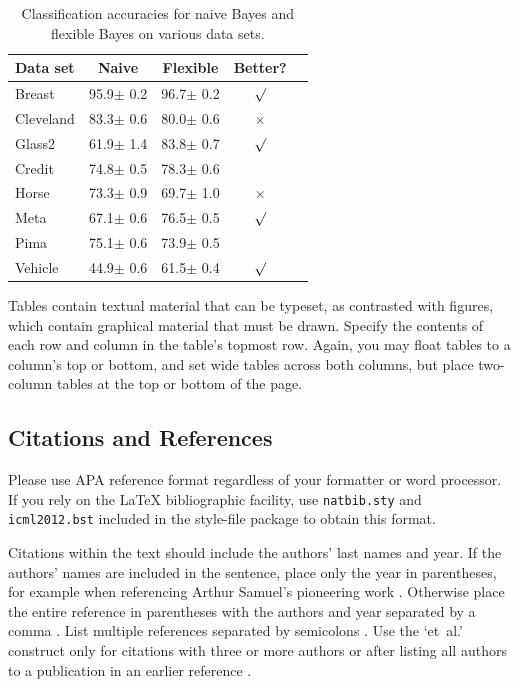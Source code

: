 \documentclass{article}
\begin{document}
\begin{table}[t]
\caption{Classification accuracies for naive Bayes and flexible
Bayes on various data sets.}
\label{sample-table}
\vskip 0.15in
\begin{center}
\begin{small}
\begin{sc}
\begin{tabular}{lcccr}
\hline
\abovespace\belowspace
Data set & Naive & Flexible & Better? \\
\hline
\abovespace
Breast    & 95.9$\pm$ 0.2& 96.7$\pm$ 0.2& $\surd$ \\
Cleveland & 83.3$\pm$ 0.6& 80.0$\pm$ 0.6& $\times$\\
Glass2    & 61.9$\pm$ 1.4& 83.8$\pm$ 0.7& $\surd$ \\
Credit    & 74.8$\pm$ 0.5& 78.3$\pm$ 0.6&         \\
Horse     & 73.3$\pm$ 0.9& 69.7$\pm$ 1.0& $\times$\\
Meta      & 67.1$\pm$ 0.6& 76.5$\pm$ 0.5& $\surd$ \\
Pima      & 75.1$\pm$ 0.6& 73.9$\pm$ 0.5&         \\
\belowspace
Vehicle   & 44.9$\pm$ 0.6& 61.5$\pm$ 0.4& $\surd$ \\
\hline
\end{tabular}
\end{sc}
\end{small}
\end{center}
\vskip -0.1in
\end{table}

Tables contain textual material that can be typeset, as contrasted
with figures, which contain graphical material that must be drawn.
Specify the contents of each row and column in the table's topmost
row. Again, you may float tables to a column's top or bottom, and set
wide tables across both columns, but place two-column tables at the
top or bottom of the page.

\subsection{Citations and References}

Please use APA reference format regardless of your formatter
or word processor. If you rely on the \LaTeX\/ bibliographic
facility, use {\tt natbib.sty} and {\tt icml2012.bst}
included in the style-file package to obtain this format.

Citations within the text should include the authors' last names and
year. If the authors' names are included in the sentence, place only
the year in parentheses, for example when referencing Arthur Samuel's
pioneering work . Otherwise place the entire
reference in parentheses with the authors and year separated by a
comma \cite{Samuel59}. List multiple references separated by
semicolons \cite{kearns89,Samuel59,mitchell80}. Use the `et~al.'
construct only for citations with three or more authors or after
listing all authors to a publication in an earlier reference \cite{MachineLearningI}.
\end{document}
